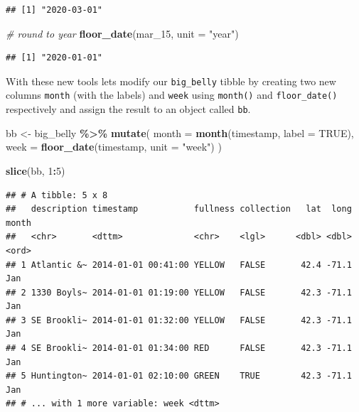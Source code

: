 \documentclass[
]{book}
\newenvironment{Shaded}{\begin{snugshade}}{\end{snugshade}}
\newcommand{\CommentTok}[1]{\textcolor[rgb]{0.56,0.35,0.01}{\textit{#1}}}
\newcommand{\DataTypeTok}[1]{\textcolor[rgb]{0.13,0.29,0.53}{#1}}
\newcommand{\DecValTok}[1]{\textcolor[rgb]{0.00,0.00,0.81}{#1}}
\newcommand{\KeywordTok}[1]{\textcolor[rgb]{0.13,0.29,0.53}{\textbf{#1}}}
\newcommand{\NormalTok}[1]{#1}
\newcommand{\OperatorTok}[1]{\textcolor[rgb]{0.81,0.36,0.00}{\textbf{#1}}}
\newcommand{\OtherTok}[1]{\textcolor[rgb]{0.56,0.35,0.01}{#1}}
\newcommand{\StringTok}[1]{\textcolor[rgb]{0.31,0.60,0.02}{#1}}
\begin{document}
\begin{verbatim}
## [1] "2020-03-01"
\end{verbatim}

\begin{Shaded}
\begin{Highlighting}[]
\CommentTok{\# round to year}
\KeywordTok{floor\_date}\NormalTok{(mar\_}\DecValTok{15}\NormalTok{, }\DataTypeTok{unit =} \StringTok{"year"}\NormalTok{)}
\end{Highlighting}
\end{Shaded}

\begin{verbatim}
## [1] "2020-01-01"
\end{verbatim}

With these new tools lets modify our \texttt{big\_belly} tibble by creating two new columns \texttt{month} (with the labels) and \texttt{week} using \texttt{month()} and \texttt{floor\_date()} respectively and assign the result to an object called \texttt{bb}.

\begin{Shaded}
\begin{Highlighting}[]
\NormalTok{bb \textless{}{-}}\StringTok{ }\NormalTok{big\_belly }\OperatorTok{\%\textgreater{}\%}\StringTok{ }
\StringTok{  }\KeywordTok{mutate}\NormalTok{(}
    \DataTypeTok{month =} \KeywordTok{month}\NormalTok{(timestamp, }\DataTypeTok{label =} \OtherTok{TRUE}\NormalTok{),}
    \DataTypeTok{week =} \KeywordTok{floor\_date}\NormalTok{(timestamp, }\DataTypeTok{unit =} \StringTok{"week"}\NormalTok{)}
\NormalTok{  )}

\KeywordTok{slice}\NormalTok{(bb, }\DecValTok{1}\OperatorTok{:}\DecValTok{5}\NormalTok{)}
\end{Highlighting}
\end{Shaded}

\begin{verbatim}
## # A tibble: 5 x 8
##   description timestamp           fullness collection   lat  long month
##   <chr>       <dttm>              <chr>    <lgl>      <dbl> <dbl> <ord>
## 1 Atlantic &~ 2014-01-01 00:41:00 YELLOW   FALSE       42.4 -71.1 Jan  
## 2 1330 Boyls~ 2014-01-01 01:19:00 YELLOW   FALSE       42.3 -71.1 Jan  
## 3 SE Brookli~ 2014-01-01 01:32:00 YELLOW   FALSE       42.3 -71.1 Jan  
## 4 SE Brookli~ 2014-01-01 01:34:00 RED      FALSE       42.3 -71.1 Jan  
## 5 Huntington~ 2014-01-01 02:10:00 GREEN    TRUE        42.3 -71.1 Jan  
## # ... with 1 more variable: week <dttm>
\end{verbatim}
\end{document}
